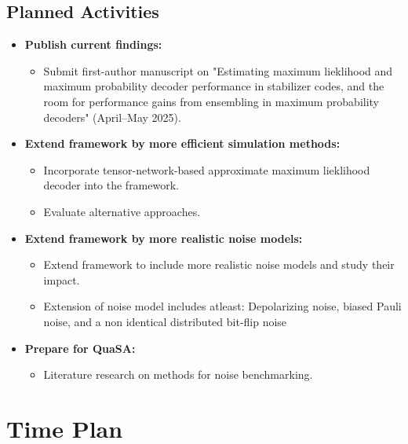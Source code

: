 \documentclass[11pt,a4paper]{article}
\begin{document}
\subsection*{Planned Activities}

\begin{itemize}[leftmargin=1.5em]
    \item \textbf{Publish current findings:}
    \begin{itemize}
        \item Submit first-author manuscript on "Estimating maximum lieklihood and maximum probability decoder performance in stabilizer codes, and the room for performance gains from ensembling in maximum probability decoders" (April–May 2025).
    \end{itemize}

    \item \textbf{Extend framework by more efficient simulation methods:}
    \begin{itemize}
        \item Incorporate tensor-network-based approximate maximum lieklihood decoder into the framework.
        \item Evaluate alternative approaches.
    \end{itemize}

    \item \textbf{Extend framework by more realistic noise models:}
    \begin{itemize}
        \item Extend framework to include more realistic noise models and study their impact.
        \item Extension of noise model includes atleast: Depolarizing noise, biased Pauli noise, and a non identical distributed bit-flip noise
    \end{itemize}

    \item \textbf{Prepare for QuaSA:}
    \begin{itemize}
        \item Literature research on methods for noise benchmarking.
    \end{itemize}
\end{itemize}

\newpage

\section*{Time Plan}
\end{document}
